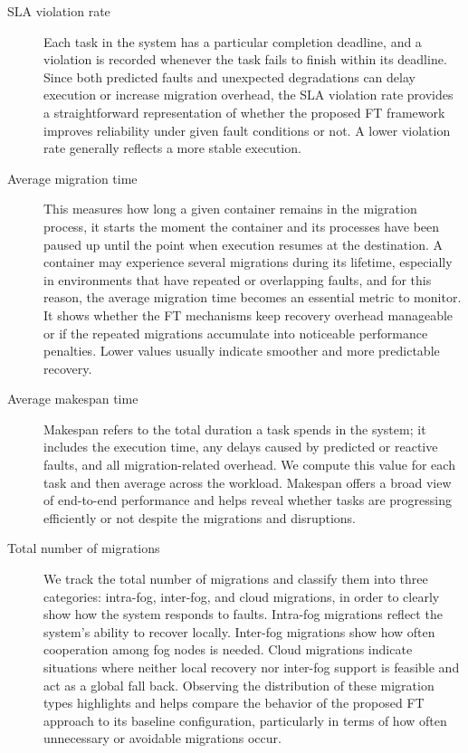 \documentclass{article}
\begin{document}
\begin{description}

\item[SLA violation rate]  
Each task in the system has a particular completion deadline, and a violation is recorded whenever the task fails to finish within its deadline. Since both predicted faults and unexpected degradations can delay execution or increase migration overhead, the SLA violation rate provides a straightforward representation of whether the proposed FT framework improves reliability under given fault conditions or not. A lower violation rate generally reflects a more stable execution.

\item[Average migration time]  
This measures how long a given container remains in the migration process, it starts the moment the container and its processes have been paused up until the point when execution resumes at the destination. A container may experience several migrations during its lifetime, especially in environments that have repeated or overlapping faults, and for this reason, the average migration time becomes an essential metric to monitor. It shows whether the FT mechanisms keep recovery overhead manageable or if the repeated migrations accumulate into noticeable performance penalties. Lower values usually indicate smoother and more predictable recovery.

\item[Average makespan time]  
Makespan refers to the total duration a task spends in the system; it includes the execution time, any delays caused by predicted or reactive faults, and all migration-related overhead. We compute this value for each task and then average across the workload. Makespan offers a broad view of end-to-end performance and helps reveal whether tasks are progressing efficiently or not despite the migrations and disruptions.

\item[Total number of migrations]  
We track the total number of migrations and classify them into three categories: intra-fog, inter-fog, and cloud migrations, in order to clearly show how the system responds to faults. Intra-fog migrations reflect the system’s ability to recover locally. Inter-fog migrations show how often cooperation among fog nodes is needed. Cloud migrations indicate situations where neither local recovery nor inter-fog support is feasible and act as a global fall back. Observing the distribution of these migration types highlights and helps compare the behavior of the proposed FT approach to its baseline configuration, particularly in terms of how often unnecessary or avoidable migrations occur.

\end{description}
\end{document}

